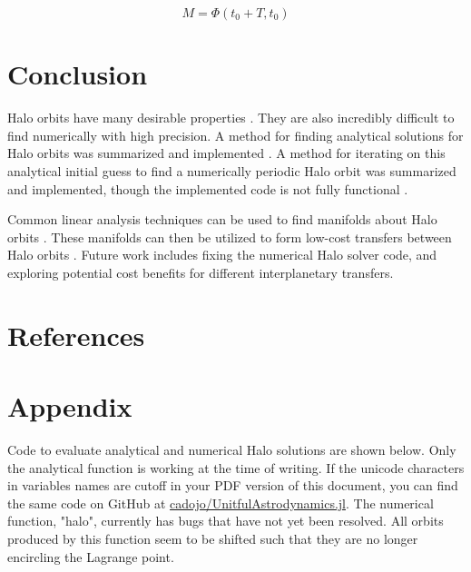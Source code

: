 \documentclass[conf]{new-aiaa}
\begin{document}
\begin{multicols}{2}
\begin{equation}
M = \Phi(t_0 + T, t_0)
\end{equation}

\section{Conclusion}
Halo orbits have many desirable properties \cite{zimovan2020near} \cite{rund2018interplanetary}.
They are also incredibly difficult to find numerically with high precision. A method for 
finding analytical solutions for Halo orbits was summarized and implemented 
\cite{rund2018interplanetary}. A method for iterating on this analytical initial guess 
to find a numerically periodic Halo orbit was summarized and implemented, though 
the implemented code is not fully functional \cite{rund2018interplanetary} \cite{howell1984three}.

Common linear analysis techniques can be used to find manifolds about Halo orbits
\cite{rund2018interplanetary} \cite{howell1984three}. These 
manifolds can then be utilized to form low-cost transfers between Halo orbits 
\cite{rund2018interplanetary}. Future work includes fixing the numerical Halo solver code,
and exploring potential cost benefits for different interplanetary transfers.

\end{multicols}

\section{References}


\newpage
\section{Appendix}

Code to evaluate analytical and numerical Halo solutions are shown below. Only the 
analytical function is working at the time of writing. If the unicode characters in 
variables names are cutoff in your PDF version of this document, you can find 
the same code on GitHub at \href{https://github.com/cadojo/UnitfulAstrodynamics.jl/blob/dev/src/ThreeBody/ThreeBodyCalculations.jl}{cadojo/UnitfulAstrodynamics.jl}. 
The numerical function, "halo", currently has bugs that have not yet been resolved.
All orbits produced by this function seem to be shifted such that they are 
no longer encircling the Lagrange point.  

\inputminted[breaklines=true]{julia}{../../../../../../FOSS/UnitfulAstrodynamics/src/ThreeBody/Halo.jl}
\end{document}
